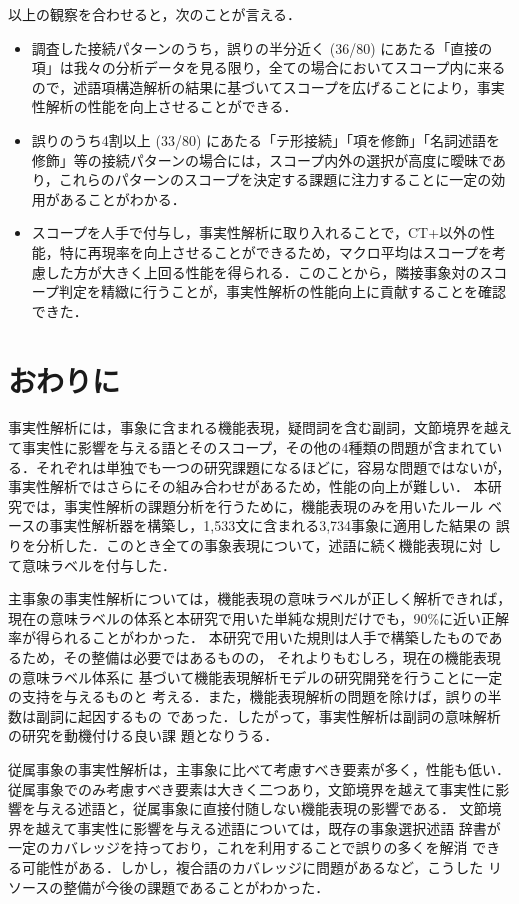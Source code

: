 \documentclass[japanese]{jnlp_1.4}
\begin{document}
以上の観察を合わせると，次のことが言える．
\begin{itemize}
\item 調査した接続パターンのうち，誤りの半分近く (36/80) にあたる「直接の項」は我々の分析データを見る限り，全ての場合においてスコープ内に来るので，述語項構造解析の結果に基づいてスコープを広げることにより，事実性解析の性能を向上させることができる．
\item 誤りのうち4割以上 (33/80) にあたる「テ形接続」「項を修飾」「名詞述語を修飾」等の接続パターンの場合には，スコープ内外の選択が高度に曖昧であり，これらのパターンのスコープを決定する課題に注力することに一定の効用があることがわかる．
\item スコープを人手で付与し，事実性解析に取り入れることで，CT+以外の性能，特に再現率を向上させることができるため，マクロ平均はスコープを考慮した方が大きく上回る性能を得られる．このことから，隣接事象対のスコープ判定を精緻に行うことが，事実性解析の性能向上に貢献することを確認できた．
\end{itemize}





\section{おわりに}
\label{sec_conc}

事実性解析には，事象に含まれる機能表現，疑問詞を含む副詞，文節境界を越え
て事実性に影響を与える語とそのスコープ，その他の4種類の問題が含まれてい
る．それぞれは単独でも一つの研究課題になるほどに，容易な問題ではないが，
事実性解析ではさらにその組み合わせがあるため，性能の向上が難しい．
本研究では，事実性解析の課題分析を行うために，機能表現のみを用いたルール
ベースの事実性解析器を構築し，1,533文に含まれる3,734事象に適用した結果の
誤りを分析した．このとき全ての事象表現について，述語に続く機能表現に対
して意味ラベルを付与した．

主事象の事実性解析については，機能表現の意味ラベルが正しく解析できれば，
現在の意味ラベルの体系と本研究で用いた単純な規則だけでも，90\%に近い正解
率が得られることがわかった．
本研究で用いた規則は人手で構築したものであるため，その整備は必要ではあるものの，
それよりもむしろ，現在の機能表現の意味ラベル体系に
基づいて機能表現解析モデルの研究開発を行うことに一定の支持を与えるものと
考える．また，機能表現解析の問題を除けば，誤りの半数は副詞に起因するもの
であった．したがって，事実性解析は副詞の意味解析の研究を動機付ける良い課
題となりうる．

従属事象の事実性解析は，主事象に比べて考慮すべき要素が多く，性能も低い．
従属事象でのみ考慮すべき要素は大きく二つあり，文節境界を越えて事実性に影響を与える述語と，従属事象に直接付随しない機能表現の影響である．
文節境界を越えて事実性に影響を与える述語については，既存の事象選択述語
辞書が一定のカバレッジを持っており，これを利用することで誤りの多くを解消
できる可能性がある．しかし，複合語のカバレッジに問題があるなど，こうした
リソースの整備が今後の課題であることがわかった．
\end{document}
